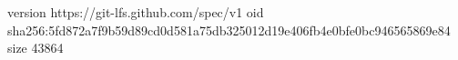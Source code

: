 version https://git-lfs.github.com/spec/v1
oid sha256:5fd872a7f9b59d89cd0d581a75db325012d19e406fb4e0bfe0bc946565869e84
size 43864
